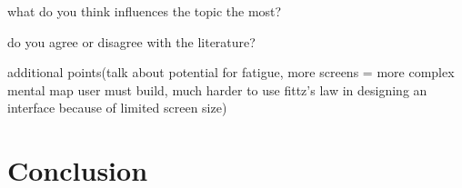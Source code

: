 \documentclass[12pt]{article}
\begin{document}
what do you think influences the topic the most?

do you agree or disagree with the literature?

additional points(talk about potential for fatigue, more screens = more complex mental map user must build, much harder to use fittz's law in designing an interface because of limited screen size)

\section{Conclusion}



\end{document}
